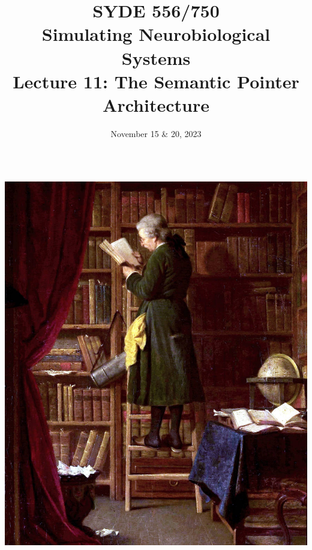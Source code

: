 \documentclass[handout,aspectratio=169]{beamer}
\date{November 15 \& 20, 2023}
\title{SYDE 556/750 \\ Simulating Neurobiological Systems \\ Lecture 11: The Semantic Pointer Architecture}
\begin{document}
	
	\begin{frame}{}
		\vspace{0.5cm}
		\begin{columns}[c]
			\MakeTitle
			\includegraphics[width=\textwidth]{media/reimer_librarian_small.jpg}
		\end{columns}
	\end{frame}
\end{document}
